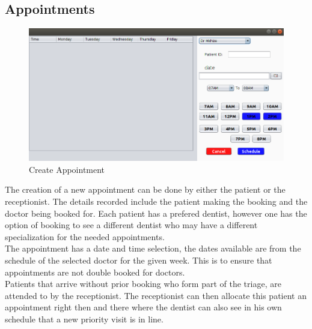 \documentclass[11 pt]{article}
\begin{document}
    \subsection{Appointments}
    \begin{figure}[h]
    \centering 
    \includegraphics[width=\linewidth]{new_appointment.png}
    \caption{Create Appointment}
    \label{fig:Appointment}
    \end{figure}
    The creation  of a new appointment can be done by either the patient or the receptionist. The details recorded include the patient making the booking and the doctor being booked for. Each patient has a prefered dentist, however one has the option of booking to see a different dentist who may have a different specialization for the needed appointments. \\
The appointment has a date and time selection, the dates available are from the schedule of the selected doctor for the given week. This is to ensure that appointments are not double booked for doctors. \\
Patients that arrive without prior booking who form part of the triage, are attended to by the receptionist. The receptionist can then allocate this patient an appointment right then and there where the dentist can also see in his own schedule that a new priority visit is in line. 
\end{document}
